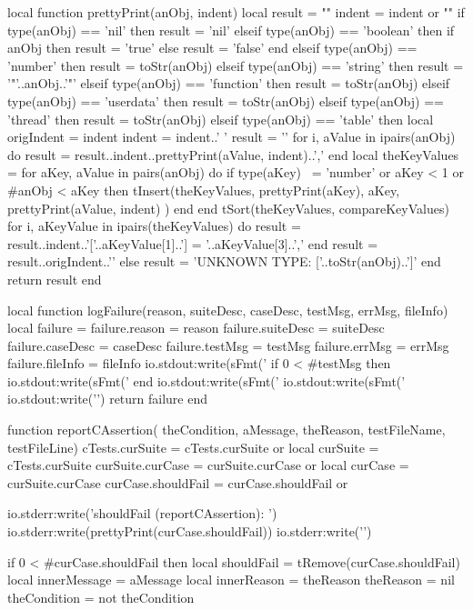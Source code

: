 local function prettyPrint(anObj, indent)
  local result = ""
  indent = indent or ""
  if type(anObj) == 'nil' then
    result = 'nil'
  elseif type(anObj) == 'boolean' then
    if anObj then result = 'true' else result = 'false' end
  elseif type(anObj) == 'number' then
    result = toStr(anObj)
  elseif type(anObj) == 'string' then
    result = '"'..anObj..'"'
  elseif type(anObj) == 'function' then
    result = toStr(anObj)
  elseif type(anObj) == 'userdata' then
    result = toStr(anObj)
  elseif type(anObj) == 'thread' then
    result = toStr(anObj)
  elseif type(anObj) == 'table' then
    local origIndent = indent
    indent = indent..'  '
    result = '{\n'
    for i, aValue in ipairs(anObj) do
      result = result..indent..prettyPrint(aValue, indent)..',\n'
    end
    local theKeyValues = { }
    for aKey, aValue in pairs(anObj) do
      if type(aKey) ~= 'number' or aKey < 1 or #anObj < aKey then
        tInsert(theKeyValues,
          { prettyPrint(aKey), aKey, prettyPrint(aValue, indent) })
      end
    end
    tSort(theKeyValues, compareKeyValues)
    for i, aKeyValue in ipairs(theKeyValues) do
      result = result..indent..'['..aKeyValue[1]..'] = '..aKeyValue[3]..',\n'
    end
    result = result..origIndent..'}'
  else
    result = 'UNKNOWN TYPE: ['..toStr(anObj)..']'
  end
  return result
end

local function logFailure(reason, suiteDesc, caseDesc,
                          testMsg, errMsg, fileInfo)
  local failure = {}
  failure.reason    = reason
  failure.suiteDesc = suiteDesc
  failure.caseDesc  = caseDesc
  failure.testMsg   = testMsg
  failure.errMsg    = errMsg
  failure.fileInfo  = fileInfo
  io.stdout:write(sFmt('    %
  if 0 < #testMsg then
    io.stdout:write(sFmt('    %
  end
  io.stdout:write(sFmt('    %
  io.stdout:write(sFmt('    %
  io.stdout:write('\n\n')
  return failure
end

function reportCAssertion(
  theCondition, aMessage, theReason,
  testFileName, testFileLine)
  cTests.curSuite    = cTests.curSuite or { }
  local curSuite     = cTests.curSuite
  curSuite.curCase   = curSuite.curCase or { }
  local curCase      = curSuite.curCase
  curCase.shouldFail = curCase.shouldFail or { }

  io.stderr:write('shouldFail (reportCAssertion): \n')
  io.stderr:write(prettyPrint(curCase.shouldFail))
  io.stderr:write('\n')
  
  if 0 < #curCase.shouldFail then
    local shouldFail   = tRemove(curCase.shouldFail)
    local innerMessage = aMessage
    local innerReason  = theReason
    theReason          = nil
    theCondition       = not theCondition


